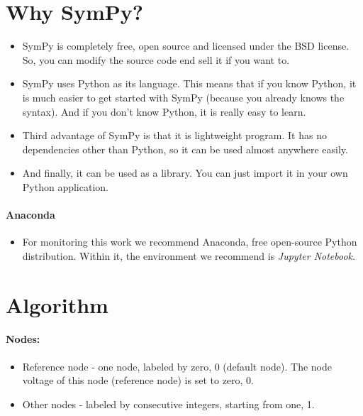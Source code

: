 \documentclass[11pt]{article}
\providecommand{\tightlist}{%
      \setlength{\itemsep}{0pt}\setlength{\parskip}{0pt}}
\begin{document}
\hypertarget{why-sympy}{%
\section{Why SymPy?}\label{why-sympy}}

\begin{itemize}
\item
  SymPy is completely free, open source and licensed under the BSD
  license. So, you can modify the source code end sell it if you want
  to.
\item
  SymPy uses Python as its language. This means that if you know Python,
  it is much easier to get started with SymPy (because you already knows
  the syntax). And if you don't know Python, it is really easy to learn.
\item
  Third advantage of SymPy is that it is lightweight program. It has no
  dependencies other than Python, so it can be used almost anywhere
  easily.
\item
  And finally, it can be used as a library. You can just import it in
  your own Python application.
\end{itemize}

\newpage
\hypertarget{anaconda}{%
\paragraph{Anaconda}\label{anaconda}}

\begin{itemize}
\tightlist
\item
  For monitoring this work we recommend Anaconda, free open-source
  Python distribution. Within it, the environment we recommend is
  \emph{Jupyter Notebook}.
\end{itemize}

\hypertarget{algorithm}{%
\section{Algorithm}\label{algorithm}}

\hypertarget{nodes}{%
\paragraph{Nodes:}\label{nodes}}

\begin{itemize}
\tightlist
\item
  Reference node - one node, labeled by zero, 0 (default node). The node
  voltage of this node (reference node) is set to zero, 0.
\item
  Other nodes - labeled by consecutive integers, starting from one, 1.
\end{itemize}
\end{document}
